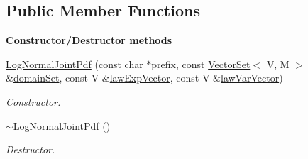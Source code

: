 \subsection*{Public Member Functions}
\begin{Indent}{\bf Constructor/\-Destructor methods}\par
\begin{DoxyCompactItemize}
\item 
\hyperlink{class_q_u_e_s_o_1_1_log_normal_joint_pdf_ac8a9ad5414281317dfe22731c672a9ca}{Log\-Normal\-Joint\-Pdf} (const char $\ast$prefix, const \hyperlink{class_q_u_e_s_o_1_1_vector_set}{Vector\-Set}$<$ V, M $>$ \&\hyperlink{class_q_u_e_s_o_1_1_base_scalar_function_ad0937628825249dd36ded3ce0c7959ac}{domain\-Set}, const V \&\hyperlink{class_q_u_e_s_o_1_1_log_normal_joint_pdf_a2ca856981ab03d0c84d19715da581c83}{law\-Exp\-Vector}, const V \&\hyperlink{class_q_u_e_s_o_1_1_log_normal_joint_pdf_afa9f7634ae6e54973cfe14463740171e}{law\-Var\-Vector})
\begin{DoxyCompactList}\small\item\em Constructor. \end{DoxyCompactList}\item 
\hyperlink{class_q_u_e_s_o_1_1_log_normal_joint_pdf_abba5c75de7f88fcf51e56aec03f35ffc}{$\sim$\-Log\-Normal\-Joint\-Pdf} ()
\begin{DoxyCompactList}\small\item\em Destructor. \end{DoxyCompactList}\end{DoxyCompactItemize}
\end{Indent}
